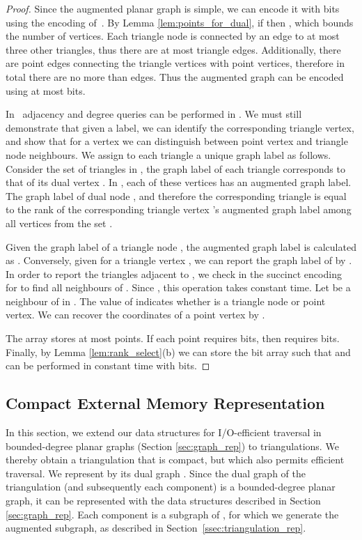 \begin{proof}
Since the augmented planar graph is simple, we can encode it with 
 bits 
using the encoding of~\cite{DBLP:journals/siamcomp/ChiangLL05}. 
By Lemma \ref{lem:points_for_dual}, if  then 
, which bounds the number of vertices. 
Each triangle node is connected by an edge to at most three
other triangles, thus there are at most  triangle edges. 
Additionally, there are  point edges connecting the 
triangle vertices with point vertices, therefore in total there are no 
more than  edges. 
Thus the augmented graph can be encoded using at most  bits. 

In~\cite{DBLP:journals/siamcomp/ChiangLL05} adjacency and degree queries
 can be performed in . 
We must still demonstrate that given a label, we can identify the corresponding 
triangle vertex, and show that for a vertex we can distinguish between point 
vertex and triangle node neighbours. 
We assign to each triangle a unique graph label as follows. 
Consider the set of triangles in , the graph label of each 
triangle corresponds to that of its dual vertex . 
In , each of these vertices has an augmented graph label.  
The graph label of dual node , and therefore the 
corresponding triangle is equal to the rank of the corresponding 
triangle vertex 's augmented graph label among all 
vertices from the set . 

Given the graph label of a triangle node ,
 the augmented graph label is calculated as .
Conversely, given  for a triangle vertex 
, we can report the graph label 
of  by . 
In order to report the triangles adjacent to , we check in 
the succinct encoding for  to find all neighbours of 
. 
Since , this operation takes constant time. 
Let  be a neighbour of  in 
. 
The value of  indicates whether  is a 
triangle node or point vertex. 
We can recover the coordinates of a point vertex  by 
.

The array  stores at most  points. 
If each point requires  bits, then  
requires  bits. 
Finally, by Lemma \ref{lem:rank_select}(b) we can store the bit array 
 such that  and  can be performed in constant time 
with  bits.
\end{proof}

\subsection{Compact External Memory Representation}
\label{ssec:compact_tin_external}


In this section, we extend our data structures for I/O-efficient traversal in 
bounded-degree planar graphs (Section \ref{sec:graph_rep}) to triangulations. 
We thereby obtain a triangulation that is compact, but which also 
permits efficient traversal. 
We represent  by its dual graph . 
Since the dual graph of the triangulation (and subsequently each component) is a 
bounded-degree planar graph, it can be represented with the data structures 
described in Section \ref{sec:graph_rep}. 
Each component is a subgraph of , for which we generate the 
augmented subgraph, as described in Section~\ref{ssec:triangulation_rep}.

